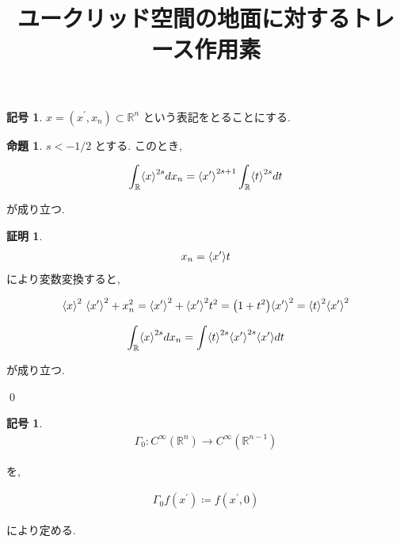 \documentclass[10pt, fleqn, label-section=none]{bxjsarticle}
\title{ユークリッド空間の地面に対するトレース作用素}
\date{}
\author{}
\theoremstyle{definition}
\newtheorem{prop}[dfn]{命題}
\newtheorem{notation}[dfn]{記号}
\newtheorem*{pf*}{証明}
\newcommand{\paren}[1]{\mleft( #1\mright )}
\newcommand{\tbra}[1]{\mleft\langle#1\mright\rangle}
\renewcommand{\;}{\, ; \,}
\begin{document}
\maketitle

\section{}

\begin{notation}$x = (x^\prime , x_n) \subset \mathbb R^n$ という表記をとることにする. 

\end{notation}

\begin{prop}$s < -1/2$ とする. このとき, 

\begin{align*} \int_{\mathbb R} \tbra{x}^{2s} dx_n = \tbra{x^\prime }^{2s + 1} \int_{\mathbb R} \tbra{t}^{2s} dt \end{align*}

が成り立つ.

\end{prop}
\begin{pf*}

\begin{align*} x_n = \tbra{x^\prime } t\end{align*}
により変数変換すると, 

\begin{align*} \tbra{x}^2 ~ \tbra{x^\prime } ^2 + x_n ^2 = \tbra{x^\prime} ^2 + \tbra{x^\prime}^2 t^2 = \paren{1 + t^2} \tbra{x^\prime} ^2 = \tbra{t}^2 \tbra{x^\prime} ^2 \end{align*}

\begin{align*}  \int_{\mathbb R} \tbra{x}^{2s} dx_n = \int \tbra{t}^{2s}\tbra{x^\prime}^{2s} \tbra{x^\prime} dt  \end{align*}

が成り立つ. 

\qed
\end{pf*}

\begin{notation}
\begin{align*} \Gamma_0 : C^\infty(\mathbb R^n) \rightarrow C^\infty(\mathbb R^{n-1}) \end{align*}

を, 

\begin{align*} \Gamma_0 f (x^\prime ) \coloneqq f(x^\prime, 0)\end{align*}

により定める. 
\end{notation}
\end{document}
